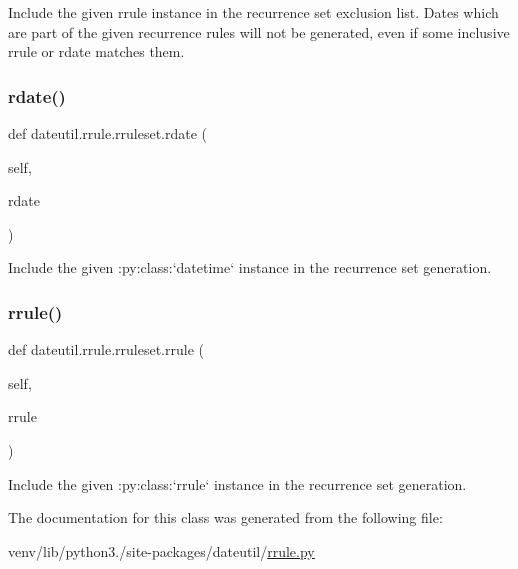 \begin{DoxyVerb}Include the given rrule instance in the recurrence set exclusion
    list. Dates which are part of the given recurrence rules will not
    be generated, even if some inclusive rrule or rdate matches them.
\end{DoxyVerb}
 \mbox{\label{classdateutil_1_1rrule_1_1rruleset_af980109179485ba7fd6e2a736206e3e1}} 
\subsubsection{\texorpdfstring{rdate()}{rdate()}}
{\footnotesize\ttfamily def dateutil.\+rrule.\+rruleset.\+rdate (\begin{DoxyParamCaption}\item[{}]{self,  }\item[{}]{rdate }\end{DoxyParamCaption})}

\begin{DoxyVerb}Include the given :py:class:`datetime` instance in the recurrence
    set generation. \end{DoxyVerb}
 \mbox{\label{classdateutil_1_1rrule_1_1rruleset_aeb2fa0bbb0410de7982b05ef805ff106}} 
\subsubsection{\texorpdfstring{rrule()}{rrule()}}
{\footnotesize\ttfamily def dateutil.\+rrule.\+rruleset.\+rrule (\begin{DoxyParamCaption}\item[{}]{self,  }\item[{}]{rrule }\end{DoxyParamCaption})}

\begin{DoxyVerb}Include the given :py:class:`rrule` instance in the recurrence set
    generation. \end{DoxyVerb}
 

The documentation for this class was generated from the following file\+:\begin{DoxyCompactItemize}
\item 
venv/lib/python3./site-\/packages/dateutil/\hyperlink{rrule_8py}{rrule.\+py}\end{DoxyCompactItemize}
